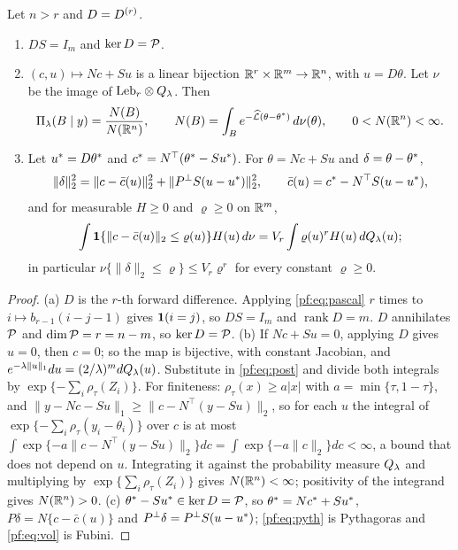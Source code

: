 \begin{lemma}[coordinates]\label{pf:lem:coord}
Let $n>r$ and $D=D^{(r)}$.
\begin{enumerate}
\renewcommand{\labelenumi}{(\alph{enumi})}
\item $DS=I_m$ and $\ker D=\mathcal P$.
\item $(c,u)\mapsto Nc+Su$ is a linear bijection $\mathbb{R}^r\times\mathbb{R}^m\to\mathbb{R}^n$, with $u=D\theta$. Let $\nu$ be the image of $\mathrm{Leb}_r\otimes Q_\lambda$. Then
\begin{equation}\label{pf:eq:ratio}
\Pi_\lambda(B\mid y)=\frac{N(B)}{N(\mathbb{R}^n)},\qquad N(B)=\int_Be^{-\widehat{\mathcal L}(\theta-\theta^{*})}\,d\nu(\theta),\qquad 0<N(\mathbb{R}^n)<\infty .
\end{equation}
\item Let $u^{*}=D\theta^{*}$ and $c^{*}=N^\top(\theta^{*}-Su^{*})$. For $\theta=Nc+Su$ and $\delta=\theta-\theta^{*}$,
\begin{equation}\label{pf:eq:pyth}
\|\delta\|_2^2=\|c-\bar c(u)\|_2^2+\|P^{\perp} S(u-u^{*})\|_2^2,\qquad \bar c(u)=c^{*}-N^\top S(u-u^{*}),
\end{equation}
and for measurable $H\ge0$ and $\varrho\ge0$ on $\mathbb{R}^m$,
\begin{equation}\label{pf:eq:vol}
\int\mathbf 1\{\|c-\bar c(u)\|_2\le\varrho(u)\}H(u)\,d\nu=V_r\int\varrho(u)^rH(u)\,dQ_\lambda(u);
\end{equation}
in particular $\nu\{\|\delta\|_2\le\varrho\}\le V_r\varrho^r$ for every constant $\varrho\ge0$.
\end{enumerate}
\end{lemma}

\begin{proof}
(a) $D$ is the $r$-th forward difference. Applying \eqref{pf:eq:pascal} $r$ times to $i\mapsto b_{r-1}(i-j-1)$ gives $\mathbf 1(i=j)$, so $DS=I_m$ and $\operatorname{rank}D=m$. $D$ annihilates $\mathcal P$ and $\dim\mathcal P=r=n-m$, so $\ker D=\mathcal P$.
(b) If $Nc+Su=0$, applying $D$ gives $u=0$, then $c=0$; so the map is bijective, with constant Jacobian, and $e^{-\lambda\|u\|_1}du=(2/\lambda)^mdQ_\lambda(u)$. Substitute in \eqref{pf:eq:post} and divide both integrals by $\exp\{-\sum_i\rho_\tau(Z_i)\}$. For finiteness: $\rho_\tau(x)\ge a|x|$ with $a=\min\{\tau,1-\tau\}$, and $\|y-Nc-Su\|_1\ge\|c-N^\top(y-Su)\|_2$, so for each $u$ the integral of $\exp\{-\sum_i\rho_\tau(y_i-\theta_i)\}$ over $c$ is at most $\int\exp\{-a\|c-N^\top(y-Su)\|_2\}dc=\int\exp\{-a\|c\|_2\}dc<\infty$, a bound that does not depend on $u$. Integrating it against the probability measure $Q_\lambda$ and multiplying by $\exp\{\sum_i\rho_\tau(Z_i)\}$ gives $N(\mathbb{R}^n)<\infty$; positivity of the integrand gives $N(\mathbb{R}^n)>0$.
(c) $\theta^{*}-Su^{*}\in\ker D=\mathcal P$, so $\theta^{*}=Nc^{*}+Su^{*}$, $P\delta=N\{c-\bar c(u)\}$ and $P^{\perp}\delta=P^{\perp} S(u-u^{*})$; \eqref{pf:eq:pyth} is Pythagoras and \eqref{pf:eq:vol} is Fubini.
\end{proof}

